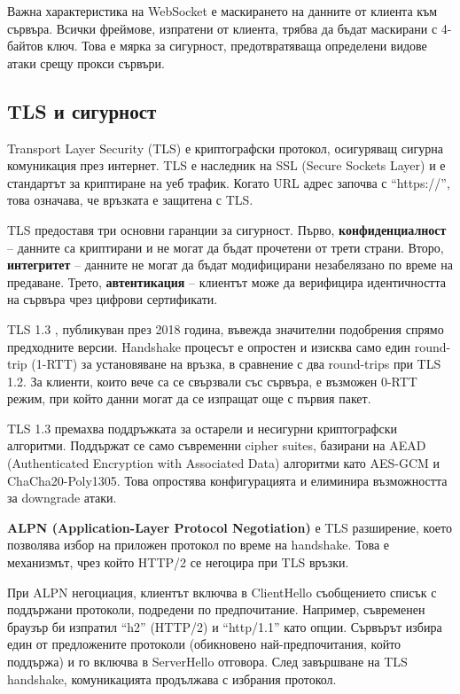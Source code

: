 Важна характеристика на WebSocket е маскирането на данните от клиента към сървъра. Всички фреймове, изпратени от клиента, трябва да бъдат маскирани с 4-байтов ключ. Това е мярка за сигурност, предотвратяваща определени видове атаки срещу прокси сървъри.

\subsection{TLS и сигурност}

Transport Layer Security (TLS) е криптографски протокол, осигуряващ сигурна комуникация през интернет. TLS е наследник на SSL (Secure Sockets Layer) и е стандартът за криптиране на уеб трафик. Когато URL адрес започва с ``https://'', това означава, че връзката е защитена с TLS.

TLS предоставя три основни гаранции за сигурност. Първо, \textbf{конфиденциалност} -- данните са криптирани и не могат да бъдат прочетени от трети страни. Второ, \textbf{интегритет} -- данните не могат да бъдат модифицирани незабелязано по време на предаване. Трето, \textbf{автентикация} -- клиентът може да верифицира идентичността на сървъра чрез цифрови сертификати.

TLS 1.3 \cite{rfc8446}, публикуван през 2018 година, въвежда значителни подобрения спрямо предходните версии. Handshake процесът е опростен и изисква само един round-trip (1-RTT) за установяване на връзка, в сравнение с два round-trips при TLS 1.2. За клиенти, които вече са се свързвали със сървъра, е възможен 0-RTT режим, при който данни могат да се изпращат още с първия пакет.

TLS 1.3 премахва поддръжката за остарели и несигурни криптографски алгоритми. Поддържат се само съвременни cipher suites, базирани на AEAD (Authenticated Encryption with Associated Data) алгоритми като AES-GCM и ChaCha20-Poly1305. Това опростява конфигурацията и елиминира възможността за downgrade атаки.

\textbf{ALPN (Application-Layer Protocol Negotiation)} \cite{rfc7301} е TLS разширение, което позволява избор на приложен протокол по време на handshake. Това е механизмът, чрез който HTTP/2 се негоцира при TLS връзки.

При ALPN негоциация, клиентът включва в ClientHello съобщението списък с поддържани протоколи, подредени по предпочитание. Например, съвременен браузър би изпратил ``h2'' (HTTP/2) и ``http/1.1'' като опции. Сървърът избира един от предложените протоколи (обикновено най-предпочитания, който поддържа) и го включва в ServerHello отговора. След завършване на TLS handshake, комуникацията продължава с избрания протокол.


